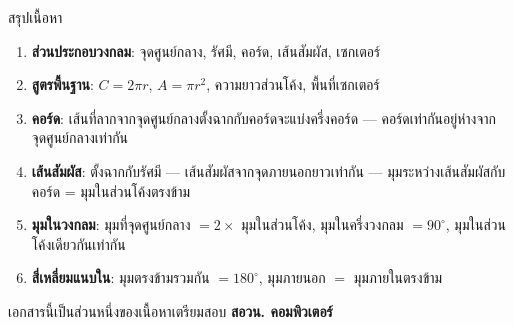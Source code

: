 \documentclass[11pt, aspectratio=169]{beamer}
\begin{document}
\begin{frame}{สรุปเนื้อหา}
  \begin{explanation}[สิ่งที่ได้เรียนรู้]
    \begin{enumerate}
      \item \textbf{ส่วนประกอบวงกลม}: จุดศูนย์กลาง, รัศมี, คอร์ด, เส้นสัมผัส, เซกเตอร์
      \item \textbf{สูตรพื้นฐาน}: $C = 2\pi r$, $A = \pi r^2$, ความยาวส่วนโค้ง, พื้นที่เซกเตอร์
      \item \textbf{คอร์ด}: เส้นที่ลากจากจุดศูนย์กลางตั้งฉากกับคอร์ดจะแบ่งครึ่งคอร์ด
             — คอร์ดเท่ากันอยู่ห่างจากจุดศูนย์กลางเท่ากัน
      \item \textbf{เส้นสัมผัส}: ตั้งฉากกับรัศมี — เส้นสัมผัสจากจุดภายนอกยาวเท่ากัน
             — มุมระหว่างเส้นสัมผัสกับคอร์ด = มุมในส่วนโค้งตรงข้าม
      \item \textbf{มุมในวงกลม}: มุมที่จุดศูนย์กลาง $= 2\times$ มุมในส่วนโค้ง,
             มุมในครึ่งวงกลม $= 90^\circ$, มุมในส่วนโค้งเดียวกันเท่ากัน
      \item \textbf{สี่เหลี่ยมแนบใน}: มุมตรงข้ามรวมกัน $= 180^\circ$,
             มุมภายนอก $=$ มุมภายในตรงข้าม
    \end{enumerate}
  \end{explanation}
  \begin{center}
    \large เอกสารนี้เป็นส่วนหนึ่งของเนื้อหาเตรียมสอบ \textbf{สอวน. คอมพิวเตอร์}
  \end{center}
\end{frame}
\end{document}
